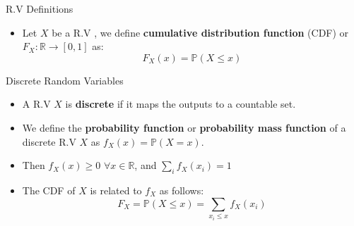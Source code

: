 \documentclass[handout]{beamer}
\begin{document}
\begin{frame}{R.V Definitions}
\scriptsize{
\begin{itemize}
 \item  Let $X$ be a R.V , we define \textbf{cumulative distribution function} (CDF) or $F_{X}: \mathbb{R} \rightarrow [0,1]$ as:
\begin{displaymath}
 F_{X}(x)=\mathbb{P}(X\leq x)
\end{displaymath}
\end{itemize}

\begin{block}{Discrete Random Variables}
\begin{itemize}
\item A R.V $X$ is \textbf{discrete} if it maps the outputs to a countable set.
\item We define the \textbf{probability function} or \textbf{probability mass function} of a discrete R.V $X$ as $f_{X}(x)=\mathbb{P}(X=x)$.
\item Then $f_{X}(x) \geq 0$  $\forall x \in \mathbb{R}$, and $\sum_{i}f_{X}(x_{i})=1$
\item The CDF of $X$ is related to $f_{X}$ as follows: 
\begin{displaymath}
F_{X}= \mathbb{P}(X\leq x)= \sum_{x_{i} \leq x} f_{X}(x_{i})  
\end{displaymath}
  
\end{itemize}
 
\end{block}



} 
\end{frame}
\end{document}
